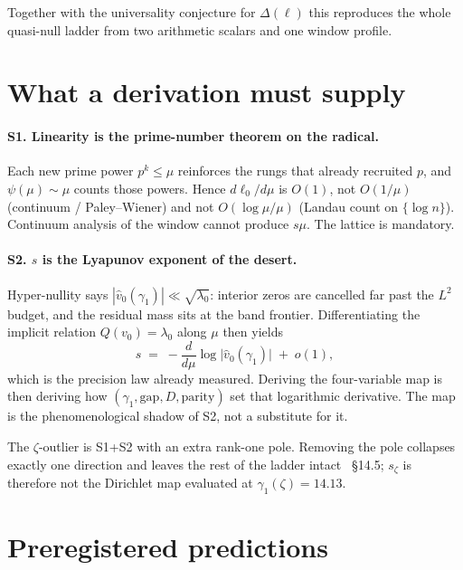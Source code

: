\documentclass[10pt]{article}
\begin{document}
Together with the universality conjecture for $\Delta(\ell)$ this
reproduces the whole quasi-null ladder from two arithmetic scalars and
one window profile.

\section{What a derivation must supply}

\paragraph{S1. Linearity is the prime-number theorem on the radical.}
Each new prime power $p^k\le\mu$ reinforces the rungs that already
recruited $p$, and $\psi(\mu)\sim\mu$ counts those powers. Hence
$d\ell_0/d\mu$ is $O(1)$, not $O(1/\mu)$ (continuum / Paley--Wiener)
and not $O(\log\mu/\mu)$ (Landau count on $\{\log n\}$). Continuum
analysis of the window cannot produce $s\mu$. The lattice is mandatory.

\paragraph{S2. $s$ is the Lyapunov exponent of the desert.}
Hyper-nullity says $|\hat v_0(\gamma_1)|\ll\sqrt{\lambda_0}$: interior
zeros are cancelled far past the $L^2$ budget, and the residual mass
sits at the band frontier. Differentiating the implicit relation
$Q(v_0)=\lambda_0$ along $\mu$ then yields
\[
s \;=\; -\frac{d}{d\mu}\log\bigl|\hat v_0(\gamma_1)\bigr|
\;+\; o(1),
\]
which is the precision law already measured. Deriving the four-variable
map is then deriving how $(\gamma_1,\text{gap},D,\text{parity})$ set
that logarithmic derivative. The map is the phenomenological shadow of
S2, not a substitute for it.

The $\zeta$-outlier is S1+S2 with an extra rank-one pole. Removing the
pole collapses exactly one direction and leaves the rest of the ladder
intact~\cite{LabNB} \S14.5; $s_\zeta$ is therefore not the Dirichlet
map evaluated at $\gamma_1(\zeta)=14.13$.

\section{Preregistered predictions}
\end{document}
